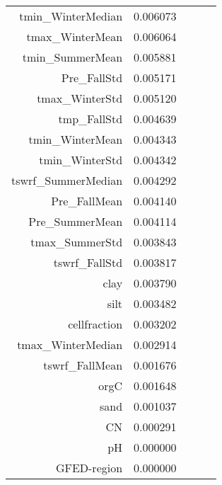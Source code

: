 \begin{table}[h]
\begin{tabular}{rrrrr}
tmin_WinterMedian & 0.006073 \\
tmax_WinterMean & 0.006064 \\
tmin_SummerMean & 0.005881 \\
Pre_FallStd & 0.005171 \\
tmax_WinterStd & 0.005120 \\
tmp_FallStd & 0.004639 \\
tmin_WinterMean & 0.004343 \\
tmin_WinterStd & 0.004342 \\
tswrf_SummerMedian & 0.004292 \\
Pre_FallMean & 0.004140 \\
Pre_SummerMean & 0.004114 \\
tmax_SummerStd & 0.003843 \\
tswrf_FallStd & 0.003817 \\
clay & 0.003790 \\
silt & 0.003482 \\
cellfraction & 0.003202 \\
tmax_WinterMedian & 0.002914 \\
tswrf_FallMean & 0.001676 \\
orgC & 0.001648 \\
sand & 0.001037 \\
CN & 0.000291 \\
pH & 0.000000 \\
GFED-region & 0.000000 \\
\bottomrule
\end{tabular}
\end{table}
